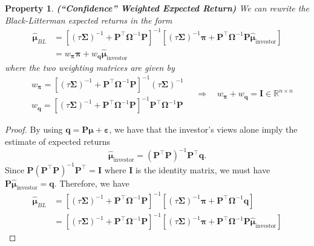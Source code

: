 \documentclass[13pt]{article}
\newtheorem{property}[theorem]{Property}
\theoremstyle{definition}
\theoremstyle{remark}
\begin{document}
\begin{property}\textbf{(``Confidence'' Weighted Expected Return)}
We can rewrite the Black-Litterman expected returns in the form
\begin{align*}
\bm{\hat{\bm{\mu}}}_{BL}&=\left[(\tau \mathbf{\Sigma})^{-1}+\mathbf{P}^{\top} \mathbf{\Omega}^{-1} \mathbf{P}\right]^{-1}\left[(\tau \mathbf{\Sigma})^{-1} \bm{\pi}+\mathbf{P}^{\top} \mathbf{\Omega}^{-1} \mathbf{P} \bm{\hat{\bm{\mu}}}_{\text{investor}}\right]\\
&= w_{\bm{\pi}}\bm{\pi} + w_{\bm{q}}\bm{\hat{\bm{\mu}}}_{\text{investor}}
\end{align*}
where the two weighting matrices are given by
$$
\begin{aligned}
& w_{\bm{\pi}}=\left[(\tau \mathbf{\Sigma})^{-1}+\mathbf{P}^{\top} \mathbf{\Omega}^{-1} \mathbf{P}\right]^{-1}(\tau \mathbf{\Sigma})^{-1} \\
& w_{\bm{q}}=\left[(\tau \mathbf{\Sigma})^{-1}+\mathbf{P}^{\top} \mathbf{\Omega}^{-1} \mathbf{P}\right]^{-1} \mathbf{P}^{\top} \mathbf{\Omega}^{-1} \mathbf{P}
\end{aligned} \quad \Longrightarrow \quad w_{\bm{\pi}}+w_{\bm{q}}=\mathbf{I} \in \mathbb{R}^{n\times n}
$$
\end{property}
\begin{proof}
    By using $\bm{q}=\mathbf{P} \bm{\mu}+\bm{\bm{\varepsilon}}$, we have that the investor's views alone imply the estimate of expected returns 
    \[\bm{\hat{\bm{\mu}}}_{\text{investor}}=\left(\mathbf{P}^{\top} \mathbf{P}\right)^{-1} \mathbf{P}^\top \bm{q}.
    \] 
    Since $\mathbf{P}\left(\mathbf{P}^{\top} \mathbf{P}\right)^{-1} \mathbf{P}^{\top}=\mathbf{I}$ where $\mathbf{I}$ is the identity matrix, we must have $\mathbf{P}\bm{\hat{\bm{\mu}}}_{\text{investor}}=\bm{q}$. Therefore, we have 
    \begin{align*}
    \bm{\hat{\bm{\mu}}}_{BL}&=\left[(\tau \mathbf{\Sigma})^{-1}+\mathbf{P}^{\top} \mathbf{\Omega}^{-1} \mathbf{P}\right]^{-1}\left[(\tau \mathbf{\Sigma})^{-1} \bm{\pi}+\mathbf{P}^{\top} \mathbf{\Omega}^{-1} \bm{q}\right]\\
    &=\left[(\tau \mathbf{\Sigma})^{-1}+\mathbf{P}^{\top} \mathbf{\Omega}^{-1} \mathbf{P}\right]^{-1}\left[(\tau \mathbf{\Sigma})^{-1} \bm{\pi}+\mathbf{P}^{\top} \mathbf{\Omega}^{-1} \mathbf{P} \bm{\hat{\bm{\mu}}}_{\text{investor}}\right]
    \end{align*}
\end{proof}
\end{document}
